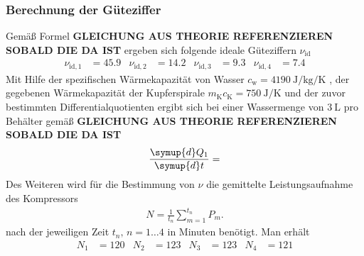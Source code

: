 \subsubsection[]{Berechnung der Güteziffer}
Gemäß Formel \textbf{GLEICHUNG AUS THEORIE REFERENZIEREN SOBALD DIE DA IST} ergeben sich folgende ideale Güteziffern $\nu_\text{id}$
\begin{align}
    \nu_{\text{id}, 1} &= 45.9 & \nu_{\text{id}, 2} &=14.2 & \nu_{\text{id}, 3} &= 9.3 & \nu_{\text{id}, 4} &= 7.4
\end{align}
Mit Hilfe der spezifischen Wärmekapazität von Wasser $c_{\text{w}} = \qty{4190}{\joule\per\kg\per\kelvin}$ \cite[]{leifi}, der gegebenen Wärmekapazität
der Kupferspirale $m_{\text{K}} c_{\text{K}} = \qty{750}{\joule\per\kelvin}$ und der zuvor bestimmten Differentialquotienten
ergibt sich bei einer Wassermenge von $\qty[]{3}{\liter}$ pro Behälter gemäß \textbf{GLEICHUNG AUS THEORIE REFERENZIEREN SOBALD DIE DA IST}
\begin{align*}
    \frac{\symup{d}Q_1}{\symup{d}t} = 
\end{align*}
%
Des Weiteren wird für die Bestimmung von $\nu$ die gemittelte Leistungsaufnahme des Kompressors
\begin{align*}
    N = \frac{1}{t_n} \sum_{m=1}^{t_n} P_m.
\end{align*}
nach der jeweiligen Zeit $t_n, \, n = 1 \dotsc 4$ in Minuten benötigt.
Man erhält
\begin{align*}
    N_1  &=  120 &
    N_2  &=  123 &
    N_3  &=  123 &
    N_4  &=  121
\end{align*}
